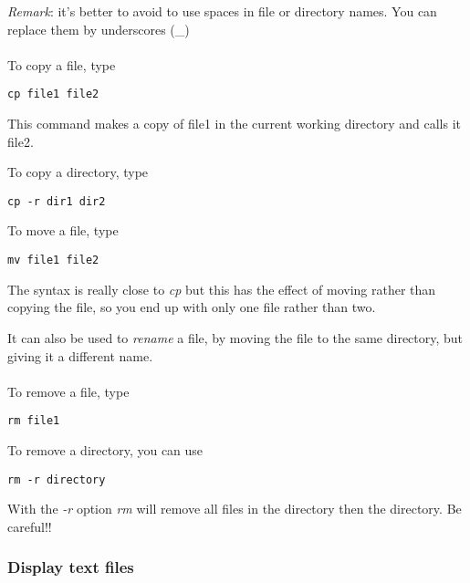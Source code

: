 \documentclass[two_sides]{my_article}
\begin{document}
\emph{Remark}: it's better to avoid to use spaces in file or directory names. You can replace them by underscores (\_)

\paragraph{}
To copy a file, type 

\begin{lstlisting}[frame=lines, numbers=none]
cp file1 file2
\end{lstlisting}

This command  makes a copy of file1 in the current working directory and calls it file2.

To copy a directory, type 

\begin{lstlisting}[frame=lines, numbers=none]
cp -r dir1 dir2
\end{lstlisting}

To move a file, type 

\begin{lstlisting}[frame=lines, numbers=none]
mv file1 file2
\end{lstlisting}

The syntax is really close to \emph{cp} but this has the effect of moving rather than copying the file, so you end up with only one file rather than two.

It can also be used to \emph{rename} a file, by moving the file to the same directory, but giving it a different name.

\paragraph{}
To remove a file, type

\begin{lstlisting}[frame=lines, numbers=none]
rm file1
\end{lstlisting}

To remove a directory, you can use

\begin{lstlisting}[frame=lines, numbers=none]
rm -r directory
\end{lstlisting}

With the \emph{-r} option \emph{rm} will remove all files in the directory then the directory. Be careful!!

\subsubsection{Display text files}
\end{document}
